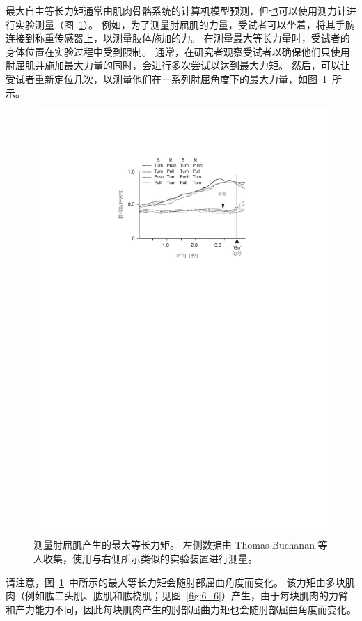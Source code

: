 最大自主等长力矩通常由肌肉骨骼系统的计算机模型预测，但也可以使用测力计进行实验测量（图~\ref{fig:6_12}）。
例如，为了测量肘屈肌的力量，受试者可以坐着，将其手腕连接到称重传感器上，以测量肢体施加的力。
在测量最大等长力量时，受试者的身体位置在实验过程中受到限制。
通常，在研究者观察受试者以确保他们只使用肘屈肌并施加最大力量的同时，会进行多次尝试以达到最大力矩。
然后，可以让受试者重新定位几次，以测量他们在一系列肘屈角度下的最大力量，如图~\ref{fig:6_12}~所示。


\begin{figure}[!htb]
	\centering
	\includegraphics[width=1.0\linewidth]{chap6/6_12}
	\caption{测量肘屈肌产生的最大等长力矩。
		左侧数据由 Thomas Buchanan 等人\cite{buchanan1998muscular}收集，使用与右侧所示类似的实验装置进行测量。 \label{fig:6_12}}
\end{figure}


请注意，图~\ref{fig:6_12}~中所示的最大等长力矩会随肘部屈曲角度而变化。
该力矩由多块肌肉（例如肱二头肌、肱肌和肱桡肌；见图~\ref{fig:6_6}）产生，由于每块肌肉的力臂和产力能力不同，因此每块肌肉产生的肘部屈曲力矩也会随肘部屈曲角度而变化。


